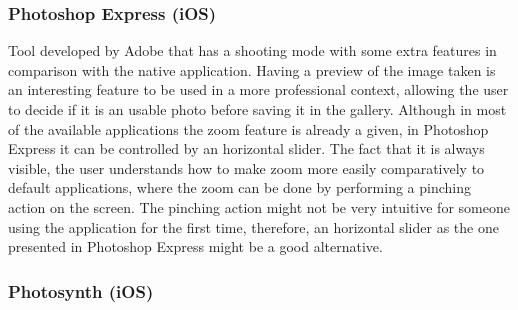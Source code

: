 

\subsubsection{Photoshop Express (iOS)}

Tool developed by Adobe \cite{Photoshop} that has a shooting mode with some extra features in comparison with the native application.
Having a preview of the image taken is an interesting feature to be used in a more professional context, allowing the user to decide if it is an usable photo before saving it in the gallery.
Although in most of the available applications the zoom feature is already a given, in Photoshop Express it can be controlled by an horizontal slider. The fact that it is always visible, the user understands how to make zoom more easily comparatively to default applications, where the zoom can be done by performing a pinching action on the screen. The pinching action might not be very intuitive for someone using the application for the first time, therefore, an horizontal slider as the one presented in Photoshop Express might be a good alternative.

\subsubsection{Photosynth (iOS)}

